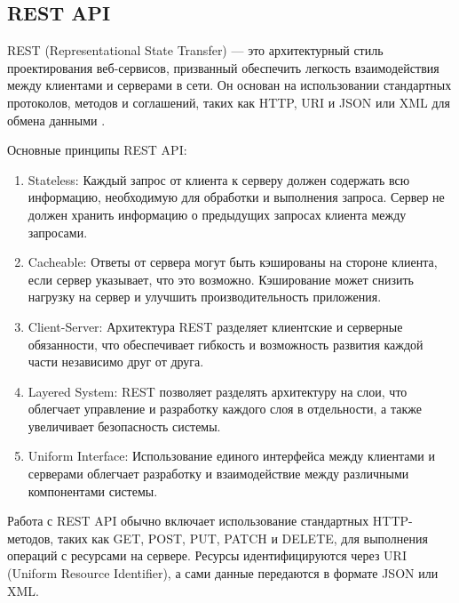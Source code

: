 \subsection{REST API}
REST (Representational State Transfer) — это архитектурный стиль проектирования веб-сервисов, призванный обеспечить легкость взаимодействия между клиентами и серверами в сети. Он основан на использовании стандартных протоколов, методов и соглашений, таких как HTTP, URI и JSON или XML для обмена данными \cite{REST}. 

Основные принципы REST API:
\begin{enumerate} 
     \item Stateless: Каждый запрос от клиента к серверу должен содержать всю информацию, необходимую для обработки и выполнения запроса. Сервер не должен хранить информацию о предыдущих запросах клиента между запросами.

    \item Cacheable: Ответы от сервера могут быть кэшированы на стороне клиента, если сервер указывает, что это возможно. Кэширование может снизить нагрузку на сервер и улучшить производительность приложения.

    \item Client-Server: Архитектура REST разделяет клиентские и серверные обязанности, что обеспечивает гибкость и возможность развития каждой части независимо друг от друга.

    \item Layered System: REST позволяет разделять архитектуру на слои, что облегчает управление и разработку каждого слоя в отдельности, а также увеличивает безопасность системы.

    \item Uniform Interface: Использование единого интерфейса между клиентами и серверами облегчает разработку и взаимодействие между различными компонентами системы.
\end{enumerate}

Работа с REST API обычно включает использование стандартных HTTP-методов, таких как GET, POST, PUT, PATCH и DELETE, для выполнения операций с ресурсами на сервере. Ресурсы идентифицируются через URI (Uniform Resource Identifier), а сами данные передаются в формате JSON или XML.

